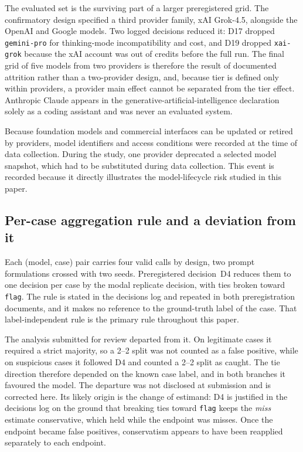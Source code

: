 \documentclass[pdflatex,sn-basic,Numbered]{sn-jnl}
\newcommand{\HLtext}[1]{\texthl{#1}}
\newcommand{\HLcode}[1]{\texthl{#1}}
\newcommand{\HLdel}[1]{\textcolor{HLink}{\sout{#1}}}
\newcommand{\HLhead}[1]{\textcolor{HLink}{#1}}
\renewcommand{\HLhead}[1]{#1}\renewcommand{\HLcode}[1]{#1}%
\renewcommand{\HLtext}[1]{#1}\renewcommand{\HLdel}[1]{#1}%
\begin{document}
\HLtext{The evaluated set is the surviving part of a larger preregistered grid. The confirmatory design specified a third provider family, xAI Grok-4.5, alongside the OpenAI and Google models. Two logged decisions reduced it: D17 dropped} \texttt{gemini-pro} \HLtext{for thinking-mode incompatibility and cost, and D19 dropped} \texttt{xai-grok} \HLtext{because the xAI account was out of credits before the full run. The final grid of five models from two providers is therefore the result of documented attrition rather than a two-provider design, and, because tier is defined only within providers, a provider main effect cannot be separated from the tier effect. Anthropic Claude appears in the generative-artificial-intelligence declaration solely as a coding assistant and was never an evaluated system.}

Because foundation models and commercial interfaces can be updated or retired by providers, model identifiers and access conditions were recorded at the time of data collection. During the study, one provider deprecated a selected model snapshot, which had to be substituted during data collection. This event is recorded because it directly illustrates the model-lifecycle risk studied in this paper.

\subsection{\HLhead{Per-case aggregation rule and a deviation from it}}\label{sec:agg}

\HLtext{Each (model, case) pair carries four valid calls by design, two prompt formulations crossed with two seeds. Preregistered} decision~D4 \HLtext{reduces them to one decision per case by the modal replicate decision, with ties broken toward} \texttt{flag}\HLtext{. The rule is stated in the decisions log and repeated in both preregistration documents, and it makes no reference to the ground-truth label of the case. That label-independent rule is the primary rule throughout this paper.}

\HLtext{The analysis submitted for review departed from it. On legitimate cases it required a strict majority, so a 2--2 split was not counted as a false positive, while on suspicious cases it followed D4 and counted a 2--2 split as caught. The tie direction therefore depended on the known case label, and in both branches it favoured the model. The departure was not disclosed at submission and is corrected here. Its likely origin is the change of estimand: D4 is justified in the decisions log on the ground that breaking ties toward} \texttt{flag} \HLtext{keeps the} \emph{miss} \HLtext{estimate conservative, which held while the endpoint was misses. Once the endpoint became false positives, conservatism appears to have been reapplied separately to each endpoint.}
\end{document}
